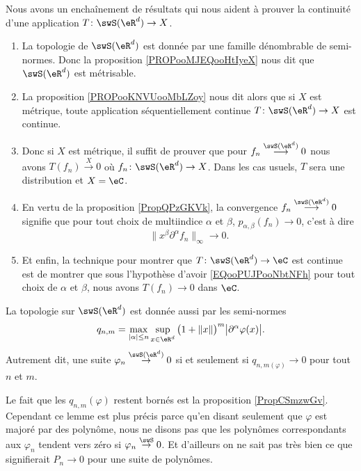 \begin{normaltext}      \label{NORMooVQESooRwJShl}
Nous avons un enchaînement de résultats qui nous aident à prouver la continuité d'une application \( T\colon \swS(\eR^d)\to X\).
\begin{enumerate}
    \item
        La topologie de \( \swS(\eR^d)\) est donnée par une famille dénombrable de semi-normes. Donc la proposition \ref{PROPooMJEQooHtIyeX} nous dit que \( \swS(\eR^d)\) est métrisable.
    \item
        La proposition \ref{PROPooKNVUooMbLZoy} nous dit alors que si \( X\) est métrique, toute application séquentiellement continue \( T\colon \swS(\eR^d)\to X\) est continue.
    \item
        Donc si \( X\) est métrique, il suffit de prouver que pour \( f_n\stackrel{\swS(\eR^d)}{\longrightarrow}0\) nous avons \( T(f_n)\stackrel{X}{\longrightarrow} 0\) où \( f_n\colon \swS(\eR^d)\to X\). Dans les cas usuels, \( T\) sera une distribution et \( X=\eC\).
    \item
        En vertu de la proposition \ref{PropQPzGKVk}, la convergence \( f_n\stackrel{\swS(\eR^d)}{\longrightarrow}0\) signifie que pour tout choix de multiindice \( \alpha\) et \( \beta\),  \( p_{\alpha,\beta}(f_n)\to 0\), c'est à dire
        \begin{equation}        \label{EQooPUJPooNbtNFh}
            \| x^{\beta}\partial^{\alpha}f_n \|_{\infty}\to 0.
        \end{equation}
    \item
        Et enfin, la technique pour montrer que \( T\colon \swS(\eR^d)\to \eC\) est continue est de montrer que sous l'hypothèse d'avoir \eqref{EQooPUJPooNbtNFh} pour tout choix de \( \alpha\) et \( \beta\), nous avons \( T(f_n)\to 0\) dans \( \eC\).
\end{enumerate}
\end{normaltext}

\begin{lemma}   \label{LemRJhCbkO}
    La topologie sur \( \swS(\eR^d)\) est donnée aussi par les semi-normes
    \begin{equation}
        q_{n,m}=\max_{| \alpha |\leq n}\sup_{x\in \eR^d}\big( 1+\| x \| \big)^m\big| \partial^{\alpha}\varphi(x) \big|.
    \end{equation}
    Autrement dit, une suite \( \varphi_n\stackrel{\swS(\eR^d)}{\to}0\) si et seulement si \( q_{n,m(\varphi)}\to 0\) pour tout \( n\) et \( m\).
\end{lemma}
Le fait que les \( q_{n,m}(\varphi)\) restent bornés est la proposition \ref{PropCSmzwGv}. Cependant ce lemme est plus précis parce qu'en disant seulement que \( \varphi\) est majoré par des polynôme, nous ne disons pas que les polynômes correspondants aux \( \varphi_n\) tendent vers zéro si \( \varphi_n\stackrel{\swS}{\to}0\). Et d'ailleurs on ne sait pas très bien ce que signifierait \( P_n\to 0\) pour une suite de polynômes.

